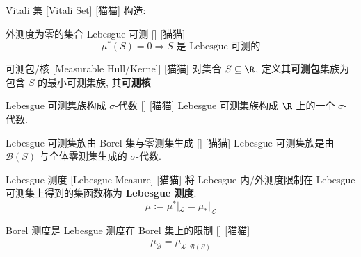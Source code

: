 \documentclass[UTF8]{ctexart}
\begin{document}
            \begin{cxmp}
                {Vitali 集}
                [Vitali Set]
                [猫猫]
                构造: 
            \end{cxmp}
            
            \begin{ppt}
                {外测度为零的集合 Lebesgue 可测}
                []
                [猫猫]
                \[\mu^*(S)=0\Longrightarrow S\text{ 是 Lebesgue 可测的}\]
            \end{ppt}
            
            \begin{dfn}
                {可测包/核}
                [Measurable Hull/Kernel]
                [猫猫]
                对集合 \(S\subseteq\R\), 定义其\textbf{可测包}集族为包含 \(S\) 的最小可测集族, 其\textbf{可测核}
            \end{dfn}
            
            \begin{thm}
                {Lebesgue 可测集族构成 \(\sigma\)-代数}
                []
                [猫猫]
                Lebesgue 可测集族构成 \(\R\) 上的一个 \(\sigma\)-代数. 
            \end{thm}
            
            \begin{crl}
                {Lebesgue 可测集族由 Borel 集与零测集生成}
                []
                [猫猫]
                Lebesgue 可测集族是由 \(\mathcal{B}(S)\) 与全体零测集生成的 \(\sigma\)-代数. 
            \end{crl}
            
            \begin{dfn}
                {Lebesgue 测度}
                [Lebesgue Measure]
                [猫猫]
                将 Lebesgue 内/外测度限制在 Lebesgue 可测集上得到的集函数称为 \textbf{Lebesgue 测度}. 
                \[\mu:=\mu^*|_\mathcal{L}=\mu_*|_\mathcal{L}\]
            \end{dfn}
            
            \begin{ppt}
                {Borel 测度是 Lebesgue 测度在 Borel 集上的限制}
                []
                [猫猫]
                \[\mu_\mathcal{B}=\mu_\mathcal{L}|_{\mathcal{B}(S)}\]
            \end{ppt}
            
\end{document}
